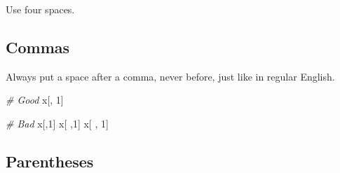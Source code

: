 \documentclass[
]{book}
\newenvironment{Shaded}{\begin{snugshade}}{\end{snugshade}}
\newcommand{\CommentTok}[1]{\textcolor[rgb]{0.56,0.35,0.01}{\textit{#1}}}
\newcommand{\DecValTok}[1]{\textcolor[rgb]{0.00,0.00,0.81}{#1}}
\newcommand{\NormalTok}[1]{#1}
\begin{document}
Use four spaces.

\hypertarget{commas}{%
\subsection{Commas}\label{commas}}

Always put a space after a comma, never before, just like in regular English.

\begin{Shaded}
\begin{Highlighting}[]
\CommentTok{# Good}
\NormalTok{x[, }\DecValTok{1}\NormalTok{]}

\CommentTok{# Bad}
\NormalTok{x[,}\DecValTok{1}\NormalTok{]}
\NormalTok{x[ ,}\DecValTok{1}\NormalTok{]}
\NormalTok{x[ , }\DecValTok{1}\NormalTok{]}
\end{Highlighting}
\end{Shaded}

\hypertarget{parentheses-1}{%
\subsection{Parentheses}\label{parentheses-1}}
\end{document}
